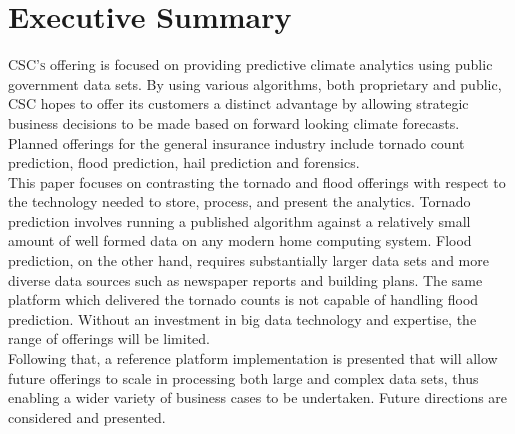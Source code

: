 \section{Executive Summary}
\textsc{CSC's} \climatedge offering is focused on providing predictive climate analytics using public government data sets. By using various algorithms, both proprietary and public, \textsc{CSC} hopes to offer its customers a distinct advantage by allowing strategic business decisions to be made based on forward looking climate forecasts. Planned offerings for the general insurance industry include tornado count prediction, flood prediction, hail prediction and forensics.\\

This paper focuses on contrasting the tornado and flood offerings with respect to the technology needed to store, process, and present the analytics. Tornado prediction involves running a published algorithm against a relatively small amount of well formed data on any modern home computing system. Flood prediction, on the other hand, requires substantially larger data sets and more diverse data sources such as newspaper reports and building plans. The same platform which delivered the tornado counts is not capable of handling flood prediction. Without an investment in big data technology and expertise, the range of \climatedge offerings will be limited. \\

Following that, a reference platform implementation is presented that will allow future \climatedge offerings to scale in processing both large and complex data sets, thus enabling a wider variety of business cases to be undertaken. Future directions are considered and presented.